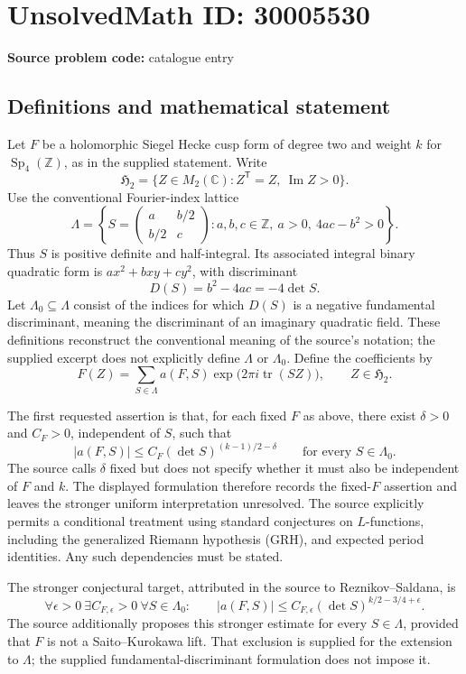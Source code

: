 \documentclass[11pt]{article}
\newcommand{\Z}{\mathbb{Z}}
\newcommand{\C}{\mathbb{C}}
\begin{document}
\section*{UnsolvedMath ID: 30005530}
\textbf{Source problem code:} catalogue entry
\subsection{Definitions and mathematical statement}
Let \(F\) be a holomorphic Siegel Hecke cusp form of degree two and weight \(k\) for \(\operatorname{Sp}_4(\Z)\), as in the supplied statement. Write
\[
\mathfrak H_2=\{Z\in M_2(\C):Z^{\mathsf T}=Z,\ \operatorname{Im}Z>0\}.
\]
Use the conventional Fourier-index lattice
\[
\Lambda=\left\{S=\begin{pmatrix}a&b/2\\b/2&c\end{pmatrix}:a,b,c\in\Z,\ a>0,\ 4ac-b^2>0\right\}.
\]
Thus \(S\) is positive definite and half-integral. Its associated integral binary quadratic form is \(ax^2+bxy+cy^2\), with discriminant
\[
D(S)=b^2-4ac=-4\det S.
\]
Let \(\Lambda_0\subseteq\Lambda\) consist of the indices for which \(D(S)\) is a negative fundamental discriminant, meaning the discriminant of an imaginary quadratic field. These definitions reconstruct the conventional meaning of the source's notation; the supplied excerpt does not explicitly define \(\Lambda\) or \(\Lambda_0\). Define the coefficients by
\[
F(Z)=\sum_{S\in\Lambda}a(F,S)\exp\!\bigl(2\pi i\operatorname{tr}(SZ)\bigr),\qquad Z\in\mathfrak H_2.
\]

The first requested assertion is that, for each fixed \(F\) as above, there exist \(\delta>0\) and \(C_F>0\), independent of \(S\), such that
\[
|a(F,S)|\le C_F(\det S)^{(k-1)/2-\delta}\qquad\text{for every }S\in\Lambda_0.
\]
The source calls \(\delta\) fixed but does not specify whether it must also be independent of \(F\) and \(k\). The displayed formulation therefore records the fixed-\(F\) assertion and leaves the stronger uniform interpretation unresolved. The source explicitly permits a conditional treatment using standard conjectures on \(L\)-functions, including the generalized Riemann hypothesis (GRH), and expected period identities. Any such dependencies must be stated.

The stronger conjectural target, attributed in the source to Reznikov--Saldana, is
\[
\forall\epsilon>0\ \exists C_{F,\epsilon}>0\ \forall S\in\Lambda_0:\qquad
|a(F,S)|\le C_{F,\epsilon}(\det S)^{k/2-3/4+\epsilon}.
\]
The source additionally proposes this stronger estimate for every \(S\in\Lambda\), provided that \(F\) is not a Saito--Kurokawa lift. That exclusion is supplied for the extension to \(\Lambda\); the supplied fundamental-discriminant formulation does not impose it.
\end{document}

